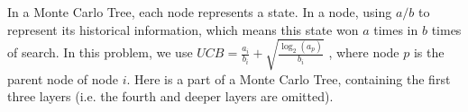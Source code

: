 In a Monte Carlo Tree, each node represents a state. In a node, using $a/b$ to represent its historical information, which means this state won $a$ times in $b$ times of search. In this problem, we use $UCB = \frac{a_i}{b_i} + \sqrt{\frac{\log_2(a_p)}{b_i}}$ , where node $p$ is the parent node of node $i$.
\newline
Here is a part of a Monte Carlo Tree, containing the first three layers (i.e. the fourth and deeper layers are omitted).

\begin{center}
\end{center}

